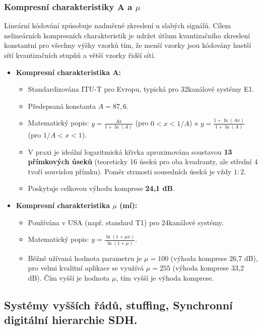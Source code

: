     \subsubsection{Kompresní charakteristiky A a $\mu$}
        Lineární kódování způsobuje nadměrné zkreslení u slabých signálů. Cílem nelineárních kompresních charakteristik je udržet útlum kvantizačního zkreslení konstantní pro všechny výšky vzorků tím, že menší vzorky jsou kódovány hustší sítí kvantizačních stupňů a větší vzorky řidší sítí.
        
        \begin{itemize}
            \item \textbf{Kompresní charakteristika A:}
            \begin{itemize}
                \item Standardizována ITU-T pro Evropu, typická pro 32kanálové systémy E1.
                \item Předepsaná konstanta $A = 87,6$.
                \item Matematický popis: 
                $y = \frac{Ax}{1+\ln(A)}$ (pro $0 < x < 1/A$) a 
                $y = \frac{1+\ln(Ax)}{1+\ln(A)}$ (pro $1/A < x < 1$).
                \item V praxi je ideální logaritmická křivka aproximována soustavou \textbf{13 přímkových úseků} (teoreticky 16 úseků pro oba kvadranty, ale střední 4 tvoří souvislou přímku). Poměr strmosti sousedních úseků je vždy $1:2$.
                \item Poskytuje celkovou výhodu komprese \textbf{24,1 dB}.
            \end{itemize}
            
            \item \textbf{Kompresní charakteristika $\mu$ (mí):}
            \begin{itemize}
                \item Používána v USA (např. standard T1) pro 24kanálové systémy.
                \item Matematický popis: $y = \frac{\ln(1+\mu x)}{\ln(1+\mu)}$.
                \item Běžně užívaná hodnota parametru je $\mu = 100$ (výhoda komprese 26,7 dB), pro velmi kvalitní aplikace se využívá $\mu = 255$ (výhoda komprese 33,2 dB). Čím vyšší je hodnota $\mu$, tím vyšší je výhoda komprese.
            \end{itemize}
        \end{itemize}
\subsection{Systémy vyšších řádů, stuffing, Synchronní digitální hierarchie SDH.}
